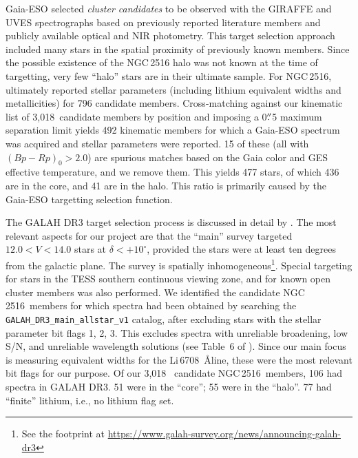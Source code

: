 \documentclass[12pt,twocolumn,tighten]{aastex63}
\newcommand{\cn}{NGC\,2516} %
\newcommand{\nkinematic}{3{,}018\ } %
\begin{document}
Gaia-ESO selected {\it cluster candidates} to be observed with the
GIRAFFE and UVES spectrographs based on previously reported literature
members and publicly available optical and NIR photometry.  This
target selection approach included many stars in the spatial proximity
of previously known members.  Since the possible existence of the \cn
halo was not known at the time of targetting, very few ``halo'' stars
are in their ultimate sample.  For \cn, \citet{randich_gaiaeso_2018}
ultimately reported stellar parameters (including lithium equivalent
widths and metallicities) for 796 candidate members.  Cross-matching
against our kinematic list of \nkinematic candidate members by position and
imposing a 0$\mbox{$.\!\!^{\prime\prime}$}$5 maximum separation limit yields 492 kinematic
members for which a Gaia-ESO spectrum was acquired and stellar
parameters were reported.  15 of these (all with $(Bp-Rp)_0 > 2.0$)
are spurious matches based on the Gaia color and GES effective
temperature, and we remove them.  This yields 477 stars, of which 436
are in the core, and 41 are in the halo.  This ratio is primarily
caused by the Gaia-ESO targetting selection function.


The GALAH DR3 target selection process is discussed in detail by
\citet{buder_galah_2020}.  The most relevant aspects for our project
are that the ``main'' survey targeted $12.0<V<14.0$ stars at
$\delta<+10^\circ$, provided the stars were at least ten degrees from the
galactic plane.  The survey is spatially inhomogeneous\footnote{See
the footprint at
\url{https://www.galah-survey.org/news/announcing-galah-dr3}}. Special
targeting for stars in the TESS southern continuous viewing zone, and
for known open cluster members was also performed.  We identified the
candidate \cn\ members
for which spectra had been obtained by searching
the \texttt{GALAH\_DR3\_main\_allstar\_v1} catalog, after excluding
stars with the stellar parameter bit flags 1, 2, 3.  This excludes
spectra with unreliable broadening, low S/N, and unreliable wavelength
solutions (see Table~6 of \citealt{buder_galah_2020}).  Since our main
focus is measuring equivalent widths for the Li\,6708\ \AA line, these
were the most relevant bit flags for our purpose.  Of our \nkinematic
candidate \cn\ members, 106 had spectra in GALAH DR3.  51 were in the
``core''; 55 were in the ``halo''.
77 had ``finite'' lithium, i.e., no lithium flag set.
\end{document}
